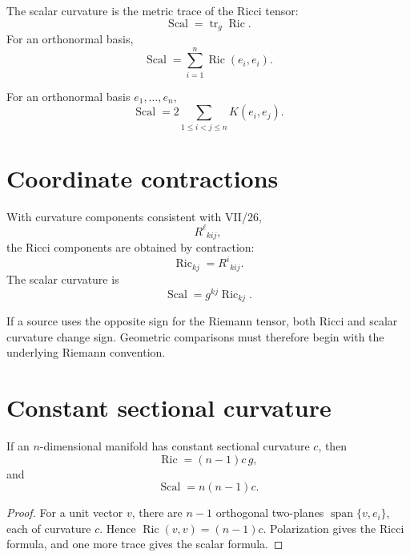 \begin{definition}\label{def:vii27-scalar}
The scalar curvature is the metric trace of the Ricci tensor:
\[
\operatorname{Scal}
=
\operatorname{tr}_g\operatorname{Ric}.
\]
For an orthonormal basis,
\[
\operatorname{Scal}
=
\sum_{i=1}^n \operatorname{Ric}(e_i,e_i).
\]
\end{definition}

\begin{proposition}\label{prop:vii27-scalar-sectional}
For an orthonormal basis \(e_1,\dots,e_n\),
\[
\operatorname{Scal}
=
2\sum_{1\le i<j\le n}K(e_i,e_j).
\]
\end{proposition}

\section{Coordinate contractions}

With curvature components consistent with VII/26,
\[
R^\ell{}_{kij},
\]
the Ricci components are obtained by contraction:
\[
\operatorname{Ric}_{kj}
=
R^i{}_{kij}.
\]
The scalar curvature is
\[
\operatorname{Scal}
=
g^{kj}\operatorname{Ric}_{kj}.
\]

\begin{warning}\label{warn:vii27-components}
If a source uses the opposite sign for the Riemann tensor, both Ricci and scalar
curvature change sign.  Geometric comparisons must therefore begin with the
underlying Riemann convention.
\end{warning}

\section{Constant sectional curvature}

\begin{theorem}\label{thm:vii27-space-form}
If an \(n\)-dimensional manifold has constant sectional curvature \(c\), then
\[
\operatorname{Ric}
=
(n-1)c\,g,
\]
and
\[
\operatorname{Scal}
=
n(n-1)c.
\]
\end{theorem}

\begin{proof}
For a unit vector \(v\), there are \(n-1\) orthogonal two-planes
\(\operatorname{span}\{v,e_i\}\), each of curvature \(c\).  Hence
\(\operatorname{Ric}(v,v)=(n-1)c\). Polarization gives the Ricci formula, and one
more trace gives the scalar formula.
\end{proof}

